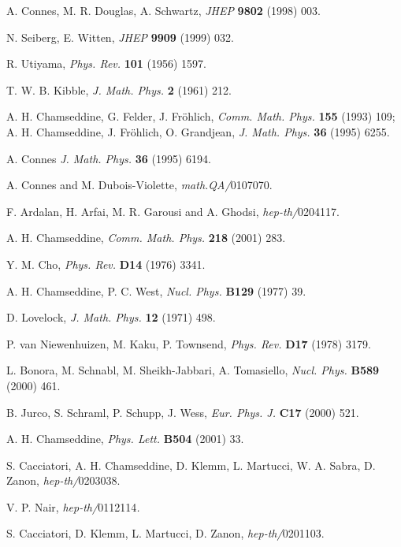 \documentclass[a4paper,a4paper]{article}
\begin{document}
\begin{thebibliography}{99}
A. Connes, M. R. Douglas, A. Schwartz, \textit{JHEP }\textbf{9802
}(1998) 003.

N. Seiberg, E. Witten, \textit{JHEP }\textbf{9909 }(1999) 032.

R. Utiyama, \textit{Phys. Rev. }\textbf{101 }(1956) 1597.

T. W. B. Kibble, \textit{J. Math. Phys. }\textbf{2 }(1961) 212.

A. H. Chamseddine, G. Felder, J. Fr\"{o}hlich, \textit{Comm.
Math. Phys. }\textbf{155 }(1993) 109; A. H. Chamseddine, J. Fr\"{o}hlich, O.
Grandjean, \textit{J. Math. Phys. }\textbf{36 }(1995) 6255.

A. Connes \textit{J. Math. Phys. }\textbf{36 }(1995) 6194.

A. Connes and M. Dubois-Violette, \textit{math.QA/}0107070.

F. Ardalan, H. Arfai, M. R. Garousi and A. Ghodsi,
\textit{hep-th/}0204117.

A. H. Chamseddine, \textit{Comm. Math. Phys. }\textbf{218
}(2001) 283.

Y. M. Cho, \textit{Phys. Rev. }\textbf{D14 }(1976) 3341.

A. H. Chamseddine, P. C. West, \textit{Nucl. Phys. }\textbf{B129
}(1977) 39.

D. Lovelock, \textit{J. Math. Phys. }\textbf{12 }(1971) 498.

P. van Niewenhuizen, M. Kaku, P. Townsend, \textit{Phys. Rev.
}\textbf{D17} (1978) 3179.

L. Bonora, M. Schnabl, M. Sheikh-Jabbari, A. Tomasiello,
\textit{Nucl. Phys. }\textbf{B589 }(2000) 461.

B. Jurco, S. Schraml, P. Schupp, J. Wess, \textit{Eur. Phys. J.
}\textbf{C17 }(2000) 521.

A. H. Chamseddine, \textit{Phys. Lett. }\textbf{B504 }(2001) 33.

S. Cacciatori, A. H. Chamseddine, D. Klemm, L. Martucci, W.
A. Sabra, D. Zanon, \textit{hep-th/}0203038.

V. P. Nair, \textit{hep-th/}0112114\textit{.}

S. Cacciatori, D. Klemm, L. Martucci, D. Zanon,
\textit{hep-th/}0201103.


\end{thebibliography}
\end{document}
